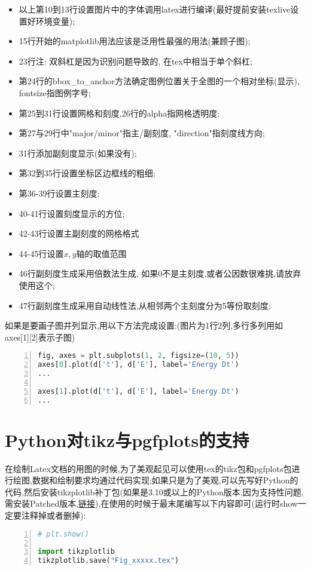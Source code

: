 \begin{itemize}
	\item{以上第10到13行设置图片中的字体调用latex进行编译(最好提前安装texlive设置好环境变量);}
	\item{15行开始的matplotlib用法应该是泛用性最强的用法(兼顾子图);}
	\item{23行注: 双斜杠是因为识别问题导致的, 在tex中相当于单个斜杠; }
	\item{第24行的bbox\_to\_anchor方法确定图例位置关于全图的一个相对坐标(显示), fontsize指图例字号; }
	\item{第25到31行设置网格和刻度,26行的alpha指网格透明度;}
	\item{第27与29行中"major/minor"指主/副刻度, "direction"指刻度线方向;}
	\item{31行添加副刻度显示(如果没有);}
	\item{第32到35行设置坐标区边框线的粗细;}
	\item{第36-39行设置主刻度;}
	\item{40-41行设置刻度显示的方位;}
	\item{42-43行设置主副刻度的网格格式}
	\item{44-45行设置$x,y$轴的取值范围}
	\item{46行副刻度生成采用倍数法生成, 如果0不是主刻度,或者公因数很难挑,请放弃使用这个;}
	\item{47行副刻度生成采用自动线性法,从相邻两个主刻度分为5等份取刻度;}
\end{itemize}

如果是要画子图并列显示,用以下方法完成设置:(图片为1行2列,多行多列用如axes[1][2]表示子图)\par

\begin{lstlisting}[numbers=left,frame=single,language=Python]
fig, axes = plt.subplots(1, 2, figsize=(10, 5))
axes[0].plot(d['t'], d['E'], label='Energy Dt')
...

axes[1].plot(d['t'], d['E'], label='Energy Dt')
...
\end{lstlisting}

\section{Python对tikz与pgfplots的支持}

在绘制Latex文档的用图的时候,为了美观起见可以使用tex的tikz包和pgfplots包进行绘图,数据和绘制要求均通过代码实现;如果只是为了美观,可以先写好Python的代码,然后安装tikzplotlib补丁包(如果是3.10或以上的Python版本,因为支持性问题,需安装Patched版本,\href{https://pypi.org/project/tikzplotlib-patched/}{链接}),在使用的时候于最末尾编写以下内容即可(运行时show一定要注释掉或者删掉):
\begin{lstlisting}[numbers=left,frame=single,language=Python]
# plt.show()

import tikzplotlib
tikzplotlib.save("Fig_xxxxx.tex")
\end{lstlisting}
\par

